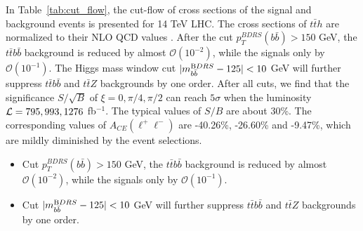 \documentclass[twocolumn,prd,noshowpacs,nofootinbib,amsmath,amssymb,superscriptaddress,preprintnumbers]{revtex4}
\begin{document}
In Table~\ref{tab:cut_flow}, the cut-flow of cross sections of the signal and background events is presented for 14 TeV LHC. The cross sections of $t\bar{t}h$ are normalized to their NLO QCD values \cite{Demartin:2014fia}. After the cut $p^{BDRS}_T(b\bar{b})>150$ GeV, the $t\bar{t}b\bar{b}$ background is reduced by almost $\mathcal{O}(10^{-2})$, while the signals only by $\mathcal{O}(10^{-1})$. The Higgs mass window cut $|m^{\text BDRS}_{b\bar{b}}-125|<10$ GeV will further suppress $t\bar{t}b\bar{b}$ and $t\bar{t}Z$ backgrounds by one order. After all cuts, we find that the significance $S/\sqrt{B}$ of $\xi=0,\pi/4,\pi/2$ can reach $5\sigma$ when the luminosity ${\cal L}=795,993,1276$ fb$^{-1}$. The typical values of $S/B$ are about 30\%. The corresponding values of $A_{CE}(\ell^+\ell^-)$ are -40.26\%, -26.60\% and -9.47\%, which are mildly diminished by the event selections.

\begin{itemize}
  \item Cut $p^{BDRS}_T(b\bar{b})>150$ GeV, the $t\bar{t}b\bar{b}$ background is reduced by almost $\mathcal{O}(10^{-2})$, while the signals only by $\mathcal{O}(10^{-1})$.
  \item Cut $|m^{\text BDRS}_{b\bar{b}}-125|<10$ GeV will further suppress $t\bar{t}b\bar{b}$ and $t\bar{t}Z$ backgrounds by one order.
\end{itemize}
\end{document}
